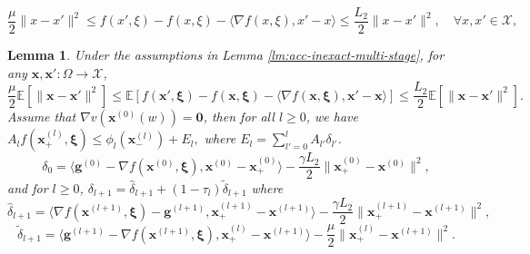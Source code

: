\documentclass[10pt,a4paper]{amsart}
\newtheorem{lemma}{Lemma}
\newcommand{\E}{\mathbb{E}}
\newcommand{\bx}{\boldsymbol{\xi}}
\newcommand{\mb}{\mathbf}
\newcommand{\mc}{\mathcal}
\begin{document}
\begin{equation}
    \frac{\mu}{2}\|x - x'\|^2\leq f(x',\xi) - f(x,\xi) - \langle \nabla f(x,\xi),x'-x\rangle \leq \frac{L_2}{2}\|x - x'\|^2,\quad \forall x,x'\in  \mc X,
\end{equation}

\begin{lemma}\label{lm:general_inexact}
Under the assumptions in Lemma \ref{lm:acc-inexact-multi-stage}, for any $
\mb x,\mb x':\Omega\to \mc X$, 
\begin{equation}\label{eq:condition-convex-smooth}
    \frac{\mu}{2}\E[\|\mb x - \mb x'\|^2]\leq \E[f(\mb x',\bx) - f(\mb x,\bx) - \langle \nabla f(\mb x,\bx),\mb x'-\mb x\rangle] \leq \frac{L_2}{2}\E[\|\mb x -\mb x'\|^2]. 
\end{equation}
Assume that $\nabla v(\mb x^{(0)}(w)) = \mb 0$, then for all $l\geq 0$, we have $A_lf(\mb x_+^{(l)},\bx)\leq \phi_l(\mb x_-^{(l)})  + E_l,$
where $E_l = \sum_{l'=0}^l A_{l'}\delta_{l'} $. 
\begin{displaymath}
    \delta_0 =\langle \mb g^{(0)} - \nabla f(\mb x^{(0)},\bx),\mb x^{(0)}-\mb x_+^{(0)}\rangle - \frac{\gamma L_2}{2}\|\mb x_+^{(0)}- \mb x^{(0)}\|^2,
\end{displaymath}
and for $l\geq 0$, $\delta_{l+1} = \hat{\delta}_{l+1} + (1-\tau_l) \tilde{\delta}_{l+1}$ where
\begin{displaymath}
    \hat{\delta}_{l+1} = \langle \nabla f(\mb x^{(l+1)},\bx)- \mb g^{(l+1)},\mb x_+^{(l+1)}-\mb x^{(l+1)}\rangle-\frac{\gamma L_2}{2}\|\mb x_+^{(l+1)}-\mb x^{(l+1)}\|^2,
\end{displaymath}
\begin{displaymath}
    \tilde{\delta}_{l+1} = \langle \mb g^{(l+1)} - \nabla f(\mb x^{(l+1)},\bx) ,\mb x_+^{(l)}-\mb x^{(l+1)}\rangle-\frac{\mu}{2}\|\mb x_+^{(l)} - \mb x^{(l+1)}\|^2.
\end{displaymath}
\end{lemma}
\end{document}
